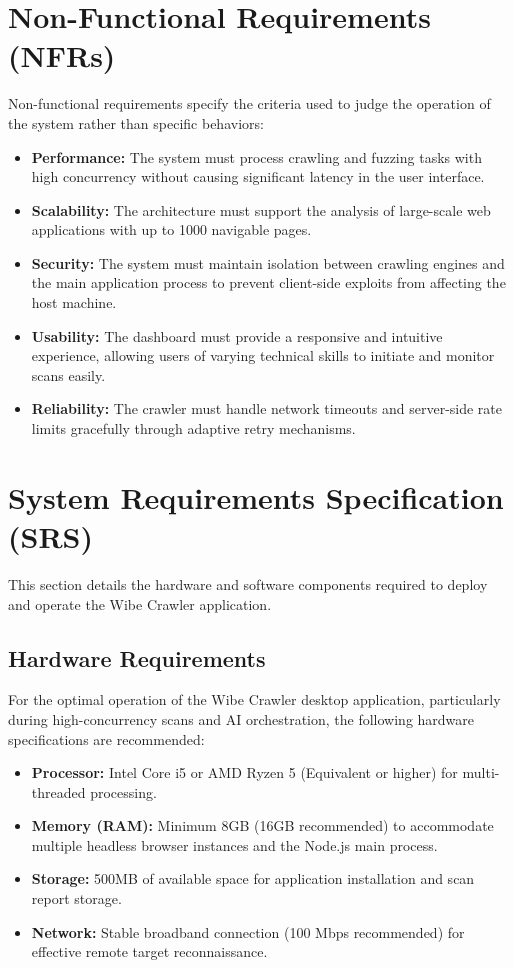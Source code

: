 \documentclass[12pt,oneside,a4paper]{book}
\begin{document}
\section{Non-Functional Requirements (NFRs)}
Non-functional requirements specify the criteria used to judge the operation of the system rather than specific behaviors:
\begin{itemize}
    \item \textbf{Performance:} The system must process crawling and fuzzing tasks with high concurrency without causing significant latency in the user interface.
    \item \textbf{Scalability:} The architecture must support the analysis of large-scale web applications with up to 1000 navigable pages.
    \item \textbf{Security:} The system must maintain isolation between crawling engines and the main application process to prevent client-side exploits from affecting the host machine.
    \item \textbf{Usability:} The dashboard must provide a responsive and intuitive experience, allowing users of varying technical skills to initiate and monitor scans easily.
    \item \textbf{Reliability:} The crawler must handle network timeouts and server-side rate limits gracefully through adaptive retry mechanisms.
\end{itemize}

\section{System Requirements Specification (SRS)}
This section details the hardware and software components required to deploy and operate the Wibe Crawler application.

\subsection{Hardware Requirements}
For the optimal operation of the Wibe Crawler desktop application, particularly during high-concurrency scans and AI orchestration, the following hardware specifications are recommended:
\begin{itemize}
    \item \textbf{Processor:} Intel Core i5 or AMD Ryzen 5 (Equivalent or higher) for multi-threaded processing.
    \item \textbf{Memory (RAM):} Minimum 8GB (16GB recommended) to accommodate multiple headless browser instances and the Node.js main process.
    \item \textbf{Storage:} 500MB of available space for application installation and scan report storage.
    \item \textbf{Network:} Stable broadband connection (100 Mbps recommended) for effective remote target reconnaissance.
\end{itemize}
\end{document}
